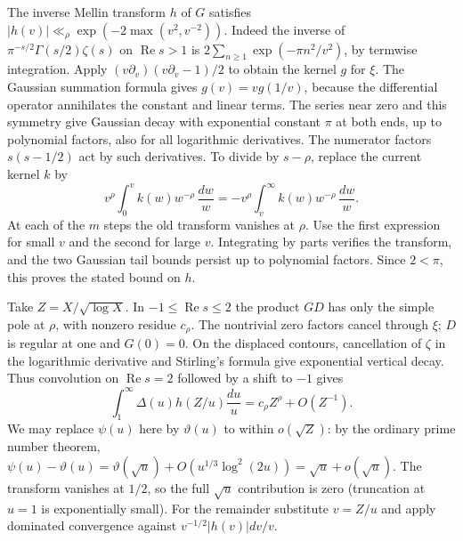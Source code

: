 \documentclass[11pt]{article}
\newcommand{\RR}{\operatorname{Re}}
\begin{document}
The inverse Mellin transform $h$ of $G$ satisfies
$|h(v)|\ll_\rho\exp(-2\max(v^2,v^{-2}))$. Indeed the inverse of $\pi^{-s/2}\Gamma(s/2)\zeta(s)$ on $\RR s>1$ is
$2\sum_{n\ge1}\exp(-\pi n^2/v^2)$, by termwise integration. Apply $(v\partial_v)(v\partial_v-1)/2$ to obtain the kernel $g$ for $\xi$. The Gaussian summation formula gives $g(v)=vg(1/v)$, because the differential operator annihilates the constant and linear terms. The series near zero and this symmetry give Gaussian decay with exponential constant $\pi$ at both ends, up to polynomial factors, also for all logarithmic derivatives. The numerator factors $s(s-1/2)$ act by such derivatives. To divide by $s-\rho$, replace the current kernel $k$ by
\[
 v^\rho\int_0^v k(w)w^{-\rho}\,\frac{dw}{w}
 =-v^\rho\int_v^\infty k(w)w^{-\rho}\,\frac{dw}{w}.
\]
At each of the $m$ steps the old transform vanishes at $\rho$. Use the first expression for small $v$ and the second for large $v$. Integrating by parts verifies the transform, and the two Gaussian tail bounds persist up to polynomial factors. Since $2<\pi$, this proves the stated bound on $h$.

Take $Z=X/\sqrt{\log X}$. In $-1\le\RR s\le2$ the product $GD$ has only the simple pole at $\rho$, with nonzero residue $c_\rho$. The nontrivial zero factors cancel through $\xi$; $D$ is regular at one and $G(0)=0$. On the displaced contours, cancellation of $\zeta$ in the logarithmic derivative and Stirling's formula give exponential vertical decay. Thus convolution on $\RR s=2$ followed by a shift to $-1$ gives
\[
 \int_1^\infty \Delta(u)h(Z/u)\frac{du}{u}=c_\rho Z^\rho+O(Z^{-1}).
\]
We may replace $\psi(u)$ here by $\vartheta(u)$ to within $o(\sqrt Z)$: by the ordinary prime number theorem, $\psi(u)-\vartheta(u)=\vartheta(\sqrt u)+O(u^{1/3}\log^2(2u))=\sqrt u+o(\sqrt u)$. The transform vanishes at $1/2$, so the full $\sqrt u$ contribution is zero (truncation at $u=1$ is exponentially small). For the remainder substitute $v=Z/u$ and apply dominated convergence against $v^{-1/2}|h(v)|dv/v$.
\end{document}
